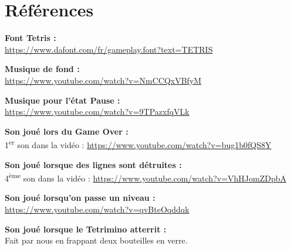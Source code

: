 \documentclass[12pt,a4paper]{report}
\begin{document}
\newpage


\chapter{Références}

\textbf{Font Tetris :}  
\\
\url{https://www.dafont.com/fr/gameplay.font?text=TETRIS}

\vspace{0.5cm}

\textbf{Musique de fond :}  
\\
\url{https://www.youtube.com/watch?v=NmCCQxVBfyM}

\vspace{0.5cm}

\textbf{Musique pour l'état Pause :}  
\\
\url{https://www.youtube.com/watch?v=9TPazxfqVLk}

\vspace{0.5cm}

\textbf{Son joué lors du Game Over :}  
\\
1\textsuperscript{er} son dans la vidéo : \url{https://www.youtube.com/watch?v=bug1b0fQS8Y}

\vspace{0.5cm}

\textbf{Son joué lorsque des lignes sont détruites :}  
\\
4\textsuperscript{ème} son dans la vidéo : \url{https://www.youtube.com/watch?v=VhHJomZDpbA}

\vspace{0.5cm}

\textbf{Son joué lorsqu'on passe un niveau :}  
\\
\url{https://www.youtube.com/watch?v=qvBteOqddqk}

\vspace{0.5cm}

\textbf{Son joué lorsque le Tetrimino atterrit :}  
\\
Fait par nous en frappant deux bouteilles en verre.
\end{document}
